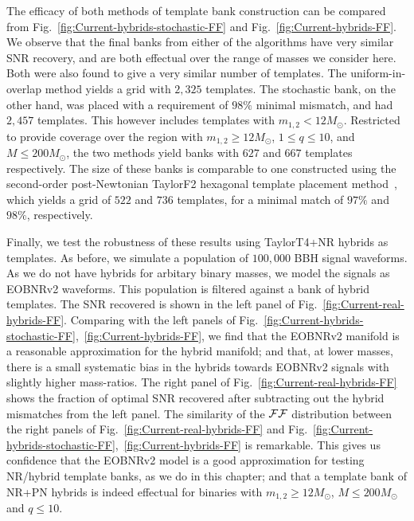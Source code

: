 The efficacy of both methods of template bank construction
can be compared from Fig.~\ref{fig:Current-hybrids-stochastic-FF} and 
Fig.~\ref{fig:Current-hybrids-FF}. We observe that the final banks from either
of the algorithms have very similar SNR recovery, and are both effectual over
the range of masses we consider here. Both were also found to give a very 
similar number of templates. The uniform-in-overlap method yields a grid 
with $2,325$ templates. The stochastic bank, on the other hand, was placed with a
requirement of $98\%$ minimal mismatch, and had $2,457$ templates. 
This however includes templates with $m_{1,2} < 12M_\odot$. Restricted
to provide coverage over the region with $m_{1,2}\geq 12M_\odot$, $1\leq q\leq 10$,
and $M\leq 200M_\odot$, the two methods yield banks with $627$ and $667$
templates respectively. The size of these banks is comparable to one 
constructed using the second-order post-Newtonian TaylorF2 hexagonal 
template placement method~\cite{SathyaBankPlacementTauN,BabaketalBankPlacement,
SathyaMetric2PN,Cokelaer:2007kx}, 
which yields a grid of $522$ and $736$ templates, for a minimal
match of $97\%$ and $98\%$, respectively.

Finally, we test the robustness of these results using TaylorT4+NR hybrids 
as templates. As before, we simulate a population of $100,000$ BBH signal 
waveforms. As we do not have hybrids for arbitary binary
masses, we model the signals as EOBNRv2 waveforms. This population is filtered
against a bank of hybrid templates. The SNR recovered is shown in the left 
panel of Fig.~\ref{fig:Current-real-hybrids-FF}. Comparing with the left panels 
of Fig.~\ref{fig:Current-hybrids-stochastic-FF},~\ref{fig:Current-hybrids-FF}, 
we find that the EOBNRv2 manifold is a reasonable approximation for the hybrid 
manifold; and that, at lower masses, there is a small systematic bias in the 
hybrids towards EOBNRv2 signals with slightly higher mass-ratios.
The right panel of Fig.~\ref{fig:Current-real-hybrids-FF} 
shows the fraction of optimal SNR recovered after subtracting out the hybrid
mismatches from the left panel. The similarity of the $\mathcal{FF}$ distribution between 
the right panels of Fig.~\ref{fig:Current-real-hybrids-FF} and 
Fig.~\ref{fig:Current-hybrids-stochastic-FF},~\ref{fig:Current-hybrids-FF}
is remarkable. This gives us confidence that the EOBNRv2 model is a good 
approximation for testing NR/hybrid template banks, as we do in this chapter; 
and that a template bank of NR+PN hybrids is indeed effectual for binaries 
with $m_{1,2}\geq 12M_\odot$, $M\leq 200M_\odot$ and $q\leq 10$.



